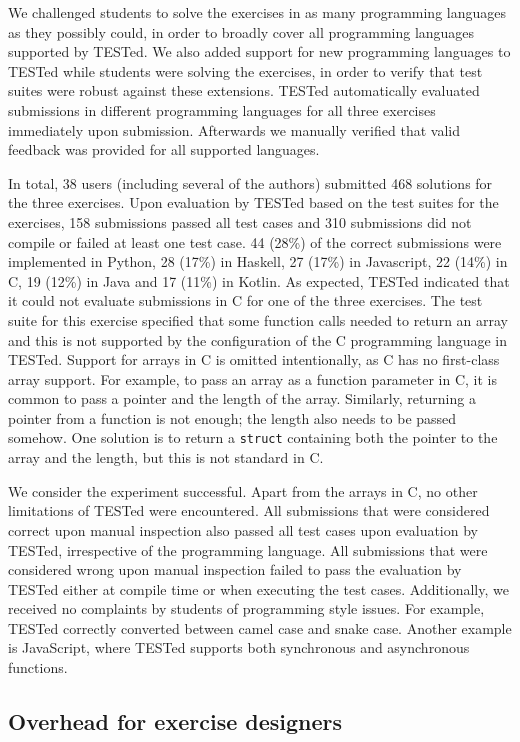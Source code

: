 \documentclass[../main]{subfiles}
\begin{document}
We challenged students to solve the exercises in as many programming languages as they possibly could, in order to broadly cover all programming languages supported by TESTed.
We also added support for new programming languages to TESTed while students were solving the exercises, in order to verify that test suites were robust against these extensions.
TESTed automatically evaluated submissions in different programming languages for all three exercises immediately upon submission.
Afterwards we manually verified that valid feedback was provided for all supported languages.

In total, 38 users (including several of the authors) submitted 468 solutions for the three exercises.
Upon evaluation by TESTed based on the test suites for the exercises, 158 submissions passed all test cases and 310 submissions did not compile or failed at least one test case.
44 (28\%) of the correct submissions were implemented in Python, 28 (17\%) in Haskell, 27 (17\%) in Javascript, 22 (14\%) in C, 19 (12\%) in Java and 17 (11\%) in Kotlin.
As expected, TESTed indicated that it could not evaluate submissions in C for one of the three exercises.
The test suite for this exercise specified that some function calls needed to return an array and this is not supported by the configuration of the C programming language in TESTed.
Support for arrays in C is omitted intentionally, as C has no first-class array support.
For example, to pass an array as a function parameter in C, it is common to pass a pointer and the length of the array.
Similarly, returning a pointer from a function is not enough;
the length also needs to be passed somehow.
One solution is to return a \texttt{struct} containing both the pointer to the array and the length, but this is not standard in C\@.

We consider the experiment successful.
Apart from the arrays in C, no other limitations of TESTed were encountered.
All submissions that were considered correct upon manual inspection also passed all test cases upon evaluation by TESTed, irrespective of the programming language.
All submissions that were considered wrong upon manual inspection failed to pass the evaluation by TESTed either at compile time or when executing the test cases.
Additionally, we received no complaints by students of programming style issues.
For example, TESTed correctly converted between camel case and snake case.
Another example is JavaScript, where TESTed supports both synchronous and asynchronous functions.

\subsection{Overhead for exercise designers}\label{subsec:overhead-for-exercise-designers}
\end{document}

